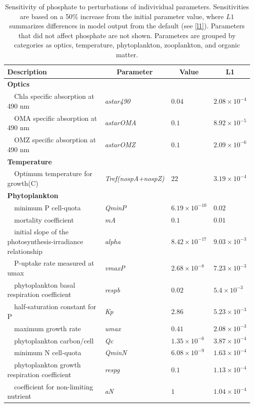 \documentclass[letterpaper,12pt,oneside]{article}\usepackage[]{graphicx}\usepackage[]{color}
\begin{document}
\begin{table}[!tbp]
{\footnotesize
\caption{Sensitivity of phosphate to perturbations of indivividual parameters.  Sensitivities are based on a 50\% increase from the initial parameter value, where $L1$ summarizes differences in model output from the default (see \cref{l1}).  Parameters that did not affect phosphate are not shown.  Parameters are grouped by categories as optics, temperature, phytoplankton, zooplankton, and organic matter.\label{tab:po4sens}} 
\begin{center}
\begin{tabular}{llll}
\hline\hline
\multicolumn{1}{l}{Description}&\multicolumn{1}{c}{Parameter}&\multicolumn{1}{c}{Value}&\multicolumn{1}{c}{L1}\tabularnewline
\hline
{\bfseries Optics}&&&\tabularnewline
~~Chla specific absorption at 490 nm&\textit{astar490}&$0.04$&$2.08\times 10^{-4}$\tabularnewline
~~OMA specific absorption at 490 nm&\textit{astarOMA}&$0.1$&$8.92\times 10^{-5}$\tabularnewline
~~OMZ specific absorption at 490 nm&\textit{astarOMZ}&$0.1$&$2.09\times 10^{-6}$\tabularnewline
\hline
{\bfseries Temperature}&&&\tabularnewline
~~Optimum temperature for growth(C)&\textit{Tref(nospA+nospZ)}&$22$&$3.19\times 10^{-4}$\tabularnewline
\hline
{\bfseries Phytoplankton}&&&\tabularnewline
~~minimum P cell-quota&\textit{QminP}&$6.19\times 10^{-10}$&$0.02$\tabularnewline
~~mortality coefficient&\textit{mA}&$0.1$&$0.01$\tabularnewline
~~initial slope of the photosynthesis-irradiance relationship&\textit{alpha}&$8.42\times 10^{-17}$&$9.03\times 10^{-3}$\tabularnewline
~~P-uptake rate measured at umax&\textit{vmaxP}&$2.68\times 10^{-8}$&$7.23\times 10^{-3}$\tabularnewline
~~phytoplankton basal respiration coefficient&\textit{respb}&$0.02$&$5.4\times 10^{-3}$\tabularnewline
~~half-saturation constant for P&\textit{Kp}&$2.86$&$5.23\times 10^{-3}$\tabularnewline
~~maximum growth rate&\textit{umax}&$0.41$&$2.08\times 10^{-3}$\tabularnewline
~~phytoplankton carbon/cell&\textit{Qc}&$1.35\times 10^{-6}$&$3.87\times 10^{-4}$\tabularnewline
~~minimum N cell-quota&\textit{QminN}&$6.08\times 10^{-9}$&$1.63\times 10^{-4}$\tabularnewline
~~phytoplankton growth respiration coefficient&\textit{respg}&$0.1$&$1.13\times 10^{-4}$\tabularnewline
~~coefficient for non-limiting nutrient&\textit{aN}&$1$&$1.04\times 10^{-4}$\tabularnewline

\end{tabular}
\end{center}}
\end{table}
\end{document}
